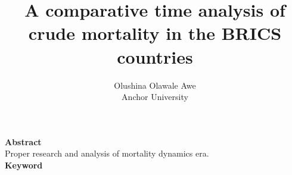 \documentclass[12pt,a4paper]{report}
\title{A comparative time analysis of crude mortality in the BRICS countries}
\author{Olushina Olawale Awe \\ Anchor University}
\begin{document}
	\maketitle


\textbf{Abstract}
\\
 
Proper research and analysis of mortality dynamics era.
\\
\textbf{Keyword}
\end{document}
